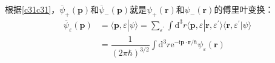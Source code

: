 \documentclass[]{article}
\begin{document}
根据\eqref{c31c31}，$\overline{\psi}_+(\boldsymbol{p})$和$\overline{\psi}_-(\boldsymbol{p})$就是$\psi_+(\boldsymbol{r})$和$\psi_-(\boldsymbol{r})$的傅里叶变换：
\begin{align}
	\overline{\psi}_\varepsilon(\boldsymbol{p})&=\langle\boldsymbol{p},\varepsilon|\psi\rangle=\sum\limits_{\varepsilon^\prime}\int\mathrm{d}^3r\langle\boldsymbol{p},\varepsilon|\boldsymbol{r},\varepsilon^\prime\rangle\langle \boldsymbol{r},\varepsilon^\prime|\psi\rangle\nonumber\\
	&=\dfrac{1}{(2\pi\hbar)^{3/2}}\int\mathrm{d}^3r\mathrm{e}^{-\mathrm{i}\boldsymbol{p}\cdot\boldsymbol{r}/\hbar}\psi_\varepsilon(\boldsymbol{r})
\end{align}
\end{document}
